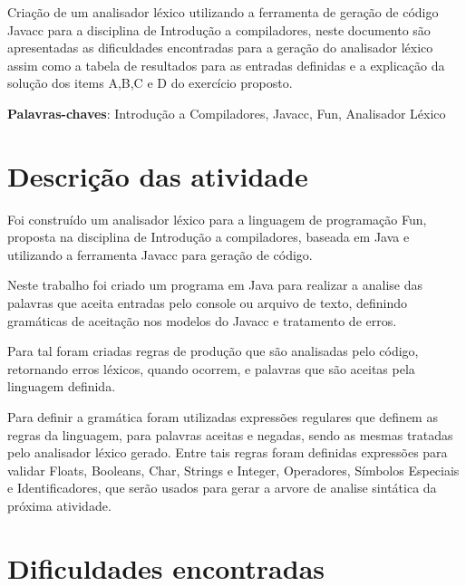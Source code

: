 \documentclass[
	article,			%
	11pt,				%
	oneside,			%
	a4paper,			%
	portuguese,			%
	brazil,				%
	sumario=tradicional
	]{abntex2}
\begin{document}
\frenchspacing 

\maketitle

\begin{resumoumacoluna}
Criação de um analisador léxico utilizando a ferramenta de geração de código Javacc para a disciplina de Introdução a compiladores, neste documento
são apresentadas as dificuldades encontradas para a geração do analisador léxico assim como a tabela de resultados para as entradas definidas e a explicação
da solução dos items A,B,C e D do exercício proposto.

 \vspace{\onelineskip}
 
 \noindent
 \textbf{Palavras-chaves}: Introdução a Compiladores, Javacc, Fun, Analisador Léxico
\end{resumoumacoluna}

\newpage
\tableofcontents*
\newpage

\textual
\section{Descrição das atividade}

Foi construído um analisador léxico para a linguagem de programação Fun, proposta na disciplina de Introdução a compiladores, baseada em Java e utilizando a 
ferramenta Javacc para geração de código.

Neste trabalho foi criado um programa em Java para realizar a analise das palavras que aceita entradas pelo console ou arquivo de texto, definindo gramáticas de
aceitação nos modelos do Javacc e tratamento de erros.

Para tal foram criadas regras de produção que são analisadas pelo código, retornando erros léxicos, quando ocorrem, e palavras que são aceitas pela linguagem definida.

Para definir a gramática foram utilizadas expressões regulares que definem as regras da linguagem, para palavras aceitas e negadas, sendo as mesmas tratadas pelo
analisador léxico gerado. Entre tais regras foram definidas expressões para validar Floats, Booleans, Char, Strings e Integer, Operadores, Símbolos Especiais e Identificadores,
que serão usados para gerar a arvore de analise sintática da próxima atividade.

\section{Dificuldades encontradas}
\end{document}

